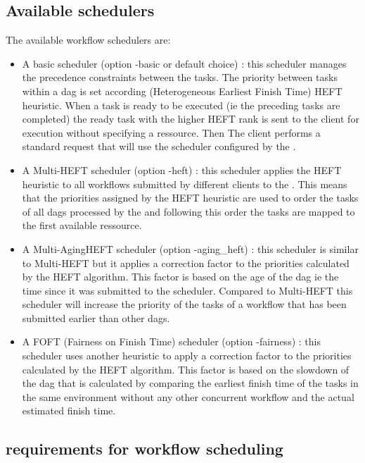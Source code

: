 \begin{itemize}
\subsection{Available schedulers}

The available \madag workflow schedulers are:

\begin{itemize}

\item A basic scheduler (option -basic or default choice) :
this scheduler manages the precedence constraints between the tasks. The
 priority between tasks within a dag is set according (Heterogeneous
Earliest Finish Time) HEFT~\cite{heft_cpop} heuristic. When a task is ready to be
executed (ie the preceding tasks are completed) the ready task with the higher
HEFT rank is sent to the client for execution without specifying a ressource.
Then The client performs a standard \diet request that will use the scheduler
configured by the \sed.

\item A Multi-HEFT scheduler (option -heft) : this scheduler applies
the HEFT heuristic to all workflows submitted by different clients to
the \madag. This means that the priorities assigned by the HEFT
heuristic are used to order the tasks of all dags processed by the
\madag and following this order the tasks are mapped to the first
available ressource.

\item A Multi-AgingHEFT scheduler (option -aging\_heft) : this scheduler
is similar to Multi-HEFT but it applies a correction factor to the
priorities calculated by the HEFT algorithm. This factor is based on
the age of the dag ie the time since it was submitted to the scheduler.
Compared to Multi-HEFT this scheduler will increase the priority of the
tasks of a workflow that has been submitted earlier than other dags.

\item A FOFT (Fairness on Finish Time) scheduler (option -fairness) :
this scheduler uses another heuristic to apply a correction factor to
the priorities calculated by the HEFT algorithm. This factor is based
on the slowdown of the dag that is calculated by comparing the earliest
finish time of the tasks in the same environment without any other
concurrent workflow and the actual estimated finish time.

\end{itemize}

\subsection{\sed requirements for workflow scheduling}


\end{itemize}
